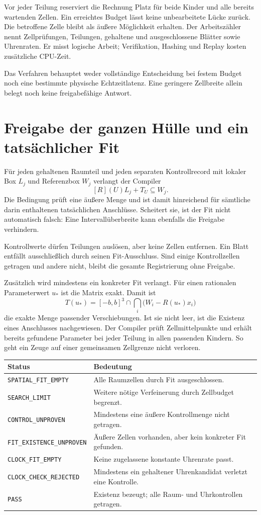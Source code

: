 \documentclass[11pt,a4paper]{article}
\newcommand{\nextsection}[2]{\clearpage{\color{accent}\small\textsf{#1}}\section{#2}}
\begin{document}
Vor jeder Teilung reserviert die Rechnung Platz für beide Kinder
und alle bereits wartenden Zellen. Ein erreichtes Budget lässt
keine unbearbeitete Lücke zurück. Die betroffene Zelle bleibt als
äußere Möglichkeit erhalten. Der Arbeitszähler nennt Zellprüfungen,
Teilungen, gehaltene und ausgeschlossene Blätter sowie Uhrenraten.
Er misst logische Arbeit; Verifikation, Hashing und Replay kosten
zusätzliche CPU-Zeit.

Das Verfahren behauptet weder vollständige Entscheidung bei
festem Budget noch eine bestimmte physische Echtzeitlatenz.
Eine geringere Zellbreite allein belegt noch keine freigabefähige Antwort.

\nextsection{101 / KONTROLLE UND EXISTENZ}{Freigabe der ganzen Hülle und ein tatsächlicher Fit}
Für jeden gehaltenen Raumteil und jeden separaten Kontrollrecord
mit lokaler Box $L_j$ und Referenzbox $W_j$ verlangt der Compiler
\[
 [R](U)L_j+T_U\subseteq W_j.
\]
Die Bedingung prüft eine äußere Menge und ist damit hinreichend
für sämtliche darin enthaltenen tatsächlichen Anschlüsse.
Scheitert sie, ist der Fit nicht automatisch falsch: Eine
Intervallüberbreite kann ebenfalls die Freigabe verhindern.

Kontrollwerte dürfen Teilungen auslösen, aber keine Zellen
entfernen. Ein Blatt entfällt ausschließlich durch seinen
Fit-Ausschluss. Sind einige Kontrollzellen getragen und andere
nicht, bleibt die gesamte Registrierung ohne Freigabe.

Zusätzlich wird mindestens ein konkreter Fit verlangt. Für einen
rationalen Parameterwert $u_*$ ist die Matrix exakt. Damit ist
\[
 T(u_*)=[-b,b]^3\cap\bigcap_i\bigl(W_i-R(u_*)x_i\bigr)
\]
die exakte Menge passender Verschiebungen. Ist sie nicht leer,
ist die Existenz eines Anschlusses nachgewiesen. Der Compiler
prüft Zellmittelpunkte und erhält bereits gefundene Parameter
bei jeder Teilung in allen passenden Kindern. So geht ein Zeuge
auf einer gemeinsamen Zellgrenze nicht verloren.

\begin{tabularx}{\linewidth}{@{}lY@{}}\toprule
Status & Bedeutung\\\midrule
\texttt{SPATIAL\_FIT\_EMPTY} & Alle Raumzellen durch Fit ausgeschlossen.\\
\texttt{SEARCH\_LIMIT} & Weitere nötige Verfeinerung durch Zellbudget begrenzt.\\
\texttt{CONTROL\_UNPROVEN} & Mindestens eine äußere Kontrollmenge nicht getragen.\\
\texttt{FIT\_EXISTENCE\_UNPROVEN} & Äußere Zellen vorhanden, aber kein konkreter Fit gefunden.\\
\texttt{CLOCK\_FIT\_EMPTY} & Keine zugelassene konstante Uhrenrate passt.\\
\texttt{CLOCK\_CHECK\_REJECTED} & Mindestens ein gehaltener Uhrenkandidat verletzt eine Kontrolle.\\
\texttt{PASS} & Existenz bezeugt; alle Raum- und Uhrkontrollen getragen.\\\bottomrule
\end{tabularx}
\end{document}
